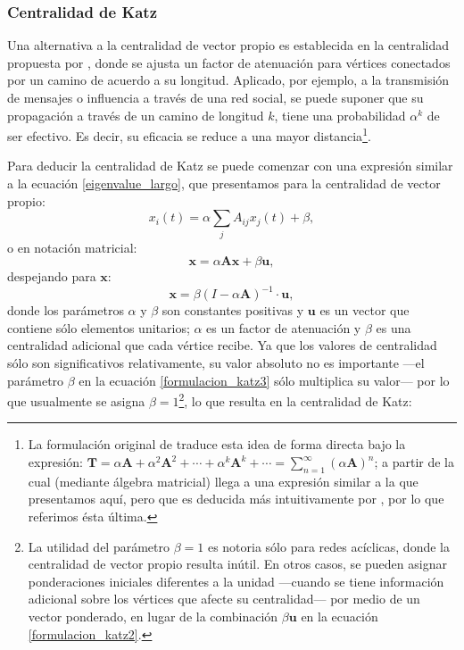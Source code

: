 \documentclass[letterpaper, 11pt]{book}
\theoremstyle{definition}
\theoremstyle{remark}
\begin{document}
\subsubsection{Centralidad de Katz}
\label{sec:Centralidad_Katz}

Una alternativa a la centralidad de vector propio es establecida en la centralidad propuesta por \citet{1953_Katz_centrality}, donde se ajusta un factor de atenuación para vértices conectados por un camino de acuerdo a su longitud. 
Aplicado, por ejemplo, a la transmisión de mensajes o influencia a través de una red social, se puede suponer que su propagación a través de un camino de longitud $k$, tiene una probabilidad $\alpha^{k}$ de ser efectivo. 
Es decir, su eficacia se reduce a una mayor distancia\footnote{
La formulación original de \citet{1953_Katz_centrality} traduce esta idea de forma directa bajo la expresión: 
$\mathbf{T} = \alpha \mathbf{A} + \alpha^2 \mathbf{A}^2 + \cdots + \alpha^k \mathbf{A}^k + \cdots 
= \sum_{n=1}^{\infty}(\alpha \mathbf{A})^n$;
a partir de la cual (mediante álgebra matricial) llega a una expresión similar a la que presentamos aquí, pero que es deducida más intuitivamente por \citet{2010_Newman_Networks}, por lo que referimos ésta última.
}.


Para deducir la centralidad de Katz se puede comenzar con una expresión similar a la ecuación \ref{eigenvalue_largo}, que presentamos para la centralidad de vector propio:
\begin{equation}\label{formulacion_katz}
    x_{i}(t) = 
    \alpha \sum_{j} A_{ij}x_{j}(t) + \beta,
\end{equation} 
o en notación matricial: 
\begin{equation}\label{formulacion_katz2}
    \mathbf{x} = 
    \alpha \mathbf{Ax} + \beta\mathbf{u},
\end{equation} 
despejando para $\mathbf{x}$:
\begin{equation}\label{formulacion_katz3}
    \mathbf{x} = 
    \beta(I-\alpha \mathbf{A})^{-1} \cdot \mathbf{u},
\end{equation} 
donde los parámetros $\alpha$ y $\beta$ son constantes positivas y $\mathbf{u}$ es un vector que contiene sólo elementos unitarios; $\alpha$ es un factor de atenuación y $\beta$ es una centralidad adicional que cada vértice recibe. 
Ya que los valores de centralidad sólo son significativos relativamente, su valor absoluto no es importante ---el parámetro $\beta$ en la ecuación \ref{formulacion_katz3} sólo multiplica su valor--- por lo que usualmente se asigna $\beta=1$\footnote{
La utilidad del parámetro $\beta=1$ es notoria sólo para redes acíclicas, donde la centralidad de vector propio resulta inútil. 
En otros casos, se pueden asignar ponderaciones iniciales diferentes a la unidad ---cuando se tiene información adicional sobre los vértices que afecte su centralidad--- por medio de un vector ponderado, en lugar de la combinación $\beta\mathbf{u}$ en la ecuación \ref{formulacion_katz2}. 
}, lo que resulta en la centralidad de Katz:
\end{document}
